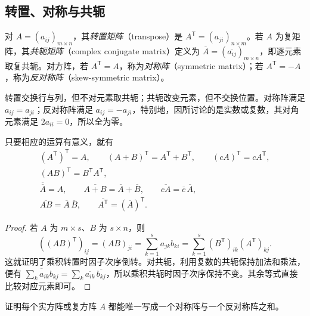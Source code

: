 \subsection{转置、对称与共轭}

\begin{definition}
\label{def:matrix-transpose-conjugate}
对 $A=(a_{ij})_{m\times n}$，其\emph{转置矩阵}（transpose）是 $A^{\mathsf T}=(a_{ji})_{n\times m}$。若 $A$ 为复矩阵，其\emph{共轭矩阵}（complex conjugate matrix）定义为 $\overline A=(\overline{a_{ij}})_{m\times n}$，即逐元素取复共轭。对方阵，若 $A^{\mathsf T}=A$，称为\emph{对称阵}（symmetric matrix）；若 $A^{\mathsf T}=-A$，称为\emph{反对称阵}（skew-symmetric matrix）。
\end{definition}

转置交换行与列，但不对元素取共轭；共轭改变元素，但不交换位置。对称阵满足 $a_{ij}=a_{ji}$；反对称阵满足 $a_{ij}=-a_{ji}$，特别地，因所讨论的是实数或复数，其对角元素满足 $2a_{ii}=0$，所以全为零。

\begin{proposition}[转置与共轭的运算规则]
\label{prop:matrix-transpose-conjugate-laws}
只要相应的运算有意义，就有
\[
    \begin{gathered}
        (A^{\mathsf T})^{\mathsf T}=A,\qquad
        (A+B)^{\mathsf T}=A^{\mathsf T}+B^{\mathsf T},\qquad
        (cA)^{\mathsf T}=cA^{\mathsf T},\\
        (AB)^{\mathsf T}=B^{\mathsf T}A^{\mathsf T},\\
        \overline{\overline A}=A,\qquad
        \overline{A+B}=\overline A+\overline B,\qquad
        \overline{cA}=\overline c\,\overline A,\\
        \overline{AB}=\overline A\,\overline B,\qquad
        \overline{A^{\mathsf T}}=(\overline A)^{\mathsf T}.
    \end{gathered}
\]
\end{proposition}

\begin{proof}
若 $A$ 为 $m\times s$、$B$ 为 $s\times n$，则
\[
    ((AB)^{\mathsf T})_{ij}
    =(AB)_{ji}=\sum_{k=1}^{s}a_{jk}b_{ki}
    =\sum_{k=1}^{s}(B^{\mathsf T})_{ik}(A^{\mathsf T})_{kj}.
\]
这就证明了乘积转置时因子次序倒转。对共轭，利用复数的共轭保持加法和乘法，便有 $\overline{\sum_k a_{ik}b_{kj}}=\sum_k\overline{a_{ik}}\,\overline{b_{kj}}$，所以乘积共轭时因子次序保持不变。其余等式直接比较对应元素即可。
\end{proof}

\begin{example}
\label{ex:matrix-symmetric-decomposition}
证明每个实方阵或复方阵 $A$ 都能唯一写成一个对称阵与一个反对称阵之和。
\end{example}

